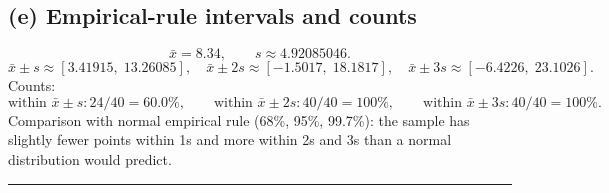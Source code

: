\documentclass[12pt]{article}
\begin{document}
\subsection*{(e) Empirical-rule intervals and counts}
\[
\bar{x}=8.34,\qquad s\approx 4.92085046.
\]
\[
\bar{x}\pm s \approx [3.41915,\;13.26085],\quad
\bar{x}\pm 2s \approx [-1.5017,\;18.1817],\quad
\bar{x}\pm 3s \approx [-6.4226,\;23.1026].
\]
Counts:
\[
\text{within }\bar{x}\pm s: 24/40 = 60.0\%,\qquad
\text{within }\bar{x}\pm 2s: 40/40 = 100\%,\qquad
\text{within }\bar{x}\pm 3s: 40/40 = 100\%.
\]
Comparison with normal empirical rule (68\%, 95\%, 99.7\%): the sample has slightly fewer points within 1s and more within 2s and 3s than a normal distribution would predict.

\noindent\rule{\textwidth}{0.4pt} %
\end{document}
